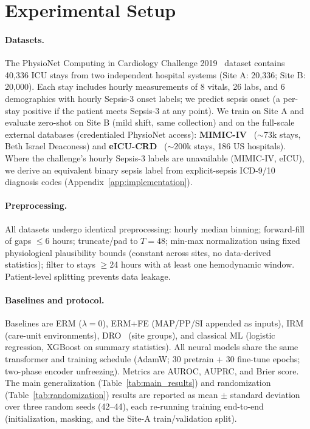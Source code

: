 \documentclass{article}
\begin{document}
\section{Experimental Setup}
\label{sec:setup}

\paragraph{Datasets.}
The PhysioNet Computing in Cardiology Challenge 2019~\citep{reyna2019early} dataset contains 40,336 ICU stays from two independent hospital systems (Site A: 20,336; Site B: 20,000). Each stay includes hourly measurements of 8 vitals, 26 labs, and 6 demographics with hourly Sepsis-3 onset labels; we predict sepsis onset (a per-stay positive if the patient meets Sepsis-3 at any point). We train on Site A and evaluate zero-shot on Site B (mild shift, same collection) and on the full-scale external databases (credentialed PhysioNet access): \textbf{MIMIC-IV}~\citep{johnson2023mimic} ($\sim$73k stays, Beth Israel Deaconess) and \textbf{eICU-CRD}~\citep{pollard2018eicu} ($\sim$200k stays, 186 US hospitals). Where the challenge's hourly Sepsis-3 labels are unavailable (MIMIC-IV, eICU), we derive an equivalent binary sepsis label from explicit-sepsis ICD-9/10 diagnosis codes (Appendix~\ref{app:implementation}).

\paragraph{Preprocessing.}
All datasets undergo identical preprocessing: hourly median binning; forward-fill of gaps $\leq$6 hours; truncate/pad to $T{=}48$; min-max normalization using fixed physiological plausibility bounds (constant across sites, no data-derived statistics); filter to stays $\geq$24 hours with at least one hemodynamic window. Patient-level splitting prevents data leakage.

\paragraph{Baselines and protocol.}
Baselines are ERM ($\lambda{=}0$), ERM+FE (MAP/PP/SI appended as inputs), IRM~\citep{arjovsky2019invariant} (care-unit environments), DRO~\citep{sagawa2020distributionally} (site groups), and classical ML (logistic regression, XGBoost on summary statistics). All neural models share the same transformer and training schedule (AdamW; 30 pretrain + 30 fine-tune epochs; two-phase encoder unfreezing). Metrics are AUROC, AUPRC, and Brier score. The main generalization (Table~\ref{tab:main_results}) and randomization (Table~\ref{tab:randomization}) results are reported as mean $\pm$ standard deviation over three random seeds (42--44), each re-running training end-to-end (initialization, masking, and the Site-A train/validation split).
\end{document}
